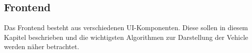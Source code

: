 \begin{newpage}
  
  \subsection{Frontend}
  \label{sub:frontend} 
    Das Frontend besteht aus verschiedenen UI-Komponenten. Diese sollen in diesem Kapitel beschrieben und die wichtigsten Algorithmen zur Darstellung der Vehicle werden näher betrachtet.


    
    
    


\end{newpage}